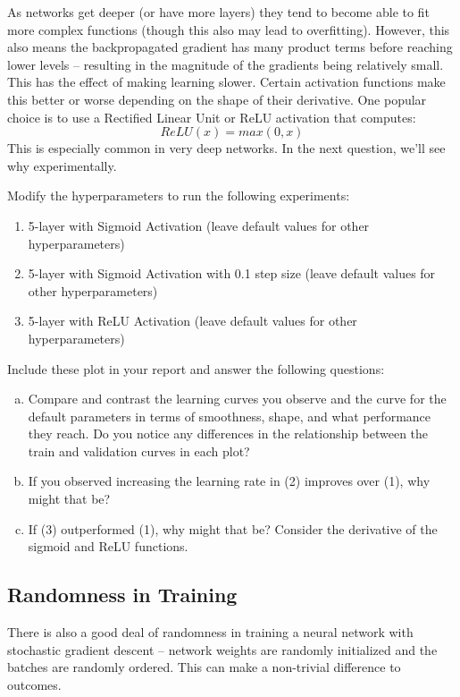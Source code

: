 \documentclass[a4paper,10pt]{article}
\begin{document}
 As networks get deeper (or have more layers) they tend to become able to fit more complex functions (though this also may lead to overfitting). However, this also means the backpropagated gradient has many product terms before reaching lower levels -- resulting in the magnitude of the gradients being relatively small. This has the effect of making learning slower. Certain activation functions make this better or worse depending on the shape of their derivative. One popular choice is to use a Rectified Linear Unit or ReLU activation that computes:
%
\begin{equation}
    ReLU(x) = max(0,x)
\end{equation}
%
This is especially common in very deep networks. In the next question, we'll see why experimentally.

\begin{taskbox}
 Modify the hyperparameters to run the following experiments:
\begin{enumerate}
    \item 5-layer with Sigmoid Activation (leave default values for other hyperparameters)
    \item 5-layer with Sigmoid Activation with 0.1 step size (leave default values for other hyperparameters)
    \item 5-layer with ReLU Activation (leave default values for other hyperparameters)
\end{enumerate}
Include these plot in your report and answer the following questions:
\begin{enumerate}[a)]
\item Compare and contrast the learning curves you observe and the curve for the default parameters in terms of smoothness, shape, and what performance they reach.  Do you notice any differences in the relationship between the train and validation curves in each plot? 
\item If you observed increasing the learning rate in (2) improves over (1), why might that be? 
\item If (3) outperformed (1), why might that be? Consider the derivative of the sigmoid and ReLU functions.
\end{enumerate}
\end{taskbox}



\subsection{Randomness in Training}
There is also a good deal of randomness in training a neural network with stochastic gradient descent -- network weights are randomly initialized and the batches are randomly ordered. This can make a non-trivial difference to outcomes. 
\end{document}
